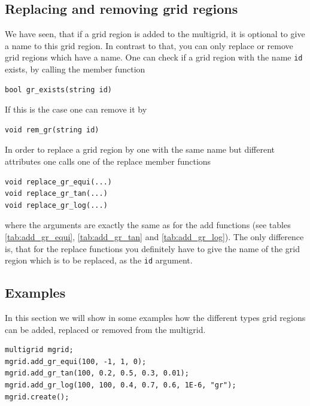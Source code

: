 \subsection{Replacing and removing grid regions}\label{subsec:grid_region_replace_remove}
We have seen, that if a grid region is added to the multigrid, it is optional to give a name to this grid region. In contrast to that, you can only replace or remove grid regions which have a name. One can check if a grid region with the name \texttt{id} exists, by calling the member function
\begin{lstlisting}
bool gr_exists(string id)
\end{lstlisting}
If this is the case one can remove it by
\begin{lstlisting}
void rem_gr(string id)
\end{lstlisting}
In order to replace a grid region by one with the same name but different attributes one calls one of the replace member functions
\begin{lstlisting}
void replace_gr_equi(...)
void replace_gr_tan(...)
void replace_gr_log(...)
\end{lstlisting}
where the arguments are exactly the same as for the add functions (see tables \ref{tab:add_gr_equi}, \ref{tab:add_gr_tan} and \ref{tab:add_gr_log}). The only difference is, that for the replace functions you definitely have to give the name of the grid region which is to be replaced, as the \texttt{id} argument.

\subsection{Examples}\label{subsec:grid_region_examples}

In this section we will show in some examples how the different types grid regions can be added, replaced or removed from the multigrid. 

\begin{lstlisting}[caption={Example for adding grid regions},label={lst:add_gr}]
multigrid mgrid;
mgrid.add_gr_equi(100, -1, 1, 0);
mgrid.add_gr_tan(100, 0.2, 0.5, 0.3, 0.01);
mgrid.add_gr_log(100, 100, 0.4, 0.7, 0.6, 1E-6, "gr");
mgrid.create();
\end{lstlisting}

